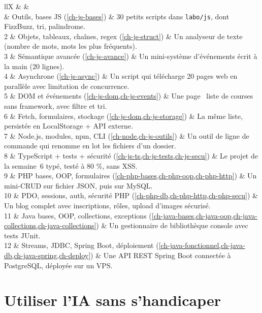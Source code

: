 \begin{tabz}{llX}
  \headrow {} \&  \&  \\
   \& Outils, bases JS (\cref{ch-js-bases}) \& 30 petits scripts dans \verb|labo/js|, dont FizzBuzz, tri, palindrome. \\
  2 \& Objets, tableaux, cha\^ines, regex (\cref{ch-js-struct}) \& Un analyseur de texte (nombre de mots, mots les plus fr\'equents). \\
  3 \& S\'emantique avanc\'ee (\cref{ch-js-avance}) \& Un mini-syst\`eme d'\'ev\'enements \'ecrit \`a la main (20 lignes). \\
  4 \& Asynchrone (\cref{ch-js-async}) \& Un script qui t\'el\'echarge 20 pages web en parall\`ele avec limitation de concurrence. \\
  5 \& DOM et \'ev\'enements (\cref{ch-js-dom,ch-js-events}) \& Une page \og ~liste de courses~ \fg{} sans framework, avec filtre et tri. \\
  6 \& Fetch, formulaires, stockage (\cref{ch-js-dom,ch-js-storage}) \& La m\^eme liste, persist\'ee en LocalStorage + API externe. \\
  7 \& Node.js, modules, npm, CLI (\cref{ch-node,ch-js-outils}) \& Un outil de ligne de commande qui renomme en lot les fichiers d'un dossier. \\
  8 \& TypeScript + tests + s\'ecurit\'e (\cref{ch-js-ts,ch-js-tests,ch-js-secu}) \& Le projet de la semaine~6 typ\'e, test\'e \`a 80 \%, sans XSS. \\
  9 \& PHP bases, OOP, formulaires (\cref{ch-php-bases,ch-php-oop,ch-php-http}) \& Un mini-CRUD sur fichier JSON, puis sur MySQL. \\
  10 \& PDO, sessions, auth, s\'ecurit\'e PHP (\cref{ch-php-db,ch-php-http,ch-php-secu}) \& Un blog complet avec inscriptions, r\^oles, upload d'images s\'ecuris\'e. \\
  11 \& Java bases, OOP, collections, exceptions (\cref{ch-java-bases,ch-java-oop,ch-java-collections,ch-java-collections}) \& Un gestionnaire de biblioth\`eque console avec tests JUnit. \\
  12 \& Streams, JDBC, Spring Boot, d\'eploiement (\cref{ch-java-fonctionnel,ch-java-db,ch-java-spring,ch-deploy}) \& Une API REST Spring Boot connect\'ee \`a PostgreSQL, d\'eploy\'ee sur un VPS. \\
\end{tabz}

\section{Utiliser l'IA sans s'handicaper}

